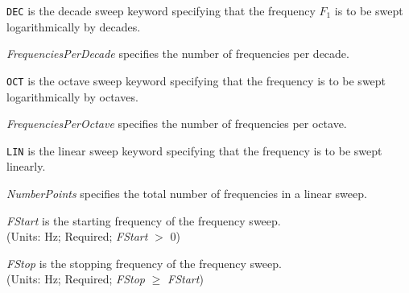 

\begin{widelist}
\item[{\tt DEC}] is the decade sweep keyword specifying that the
     frequency $F_1$ is to be swept logarithmically by decades.

\item[{\it FrequenciesPerDecade}]
      specifies the number of frequencies per decade.

\item[{\tt OCT}] is the octave sweep keyword specifying that the
     frequency is to be swept logarithmically by octaves.

\item[{\it FrequenciesPerOctave}]
      specifies the number of frequencies per octave.

\item[{\tt LIN}] is the linear sweep keyword specifying that the frequency
     is to be swept linearly.

\item[{\it NumberPoints}]
      specifies the total number of frequencies in a linear sweep.

\item[{\it FStart}]
      is the starting frequency of the frequency sweep.\\
      (Units: Hz; Required; {\it FStart} $>$ 0)

\item[{\it FStop}]
      is the stopping frequency of the frequency sweep.\\
      (Units: Hz; Required; {\it FStop} $\ge$ {\it FStart})
\end{widelist}






